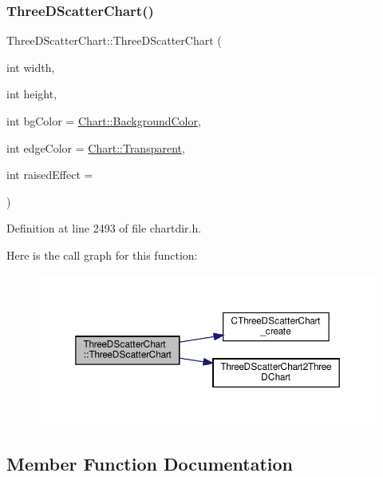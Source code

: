 \subsubsection{\texorpdfstring{Three\+D\+Scatter\+Chart()}{ThreeDScatterChart()}}
{\footnotesize\ttfamily Three\+D\+Scatter\+Chart\+::\+Three\+D\+Scatter\+Chart (\begin{DoxyParamCaption}\item[{int}]{width,  }\item[{int}]{height,  }\item[{int}]{bg\+Color = {\ttfamily \hyperlink{namespace_chart_abee0d882fdc9ad0b001245ad9fc64011a134193bde693b9d152d0c6dc59fa7d7f}{Chart\+::\+Background\+Color}},  }\item[{int}]{edge\+Color = {\ttfamily \hyperlink{namespace_chart_abee0d882fdc9ad0b001245ad9fc64011afc6811800a9e2582dac0157b6279f836}{Chart\+::\+Transparent}},  }\item[{int}]{raised\+Effect = {} }\end{DoxyParamCaption})\hspace{0.3cm}{\ttfamily [inline]}}



Definition at line 2493 of file chartdir.\+h.

Here is the call graph for this function\+:
\nopagebreak
\begin{figure}[H]
\begin{center}
\leavevmode
\includegraphics[width=350pt]{class_three_d_scatter_chart_a085e949f6fc45a224416c6d7711d863e_cgraph}
\end{center}
\end{figure}


\subsection{Member Function Documentation}
\mbox{\label{class_three_d_scatter_chart_a1e40cc9fd47aa15d5d463be0c32801e1}} 
